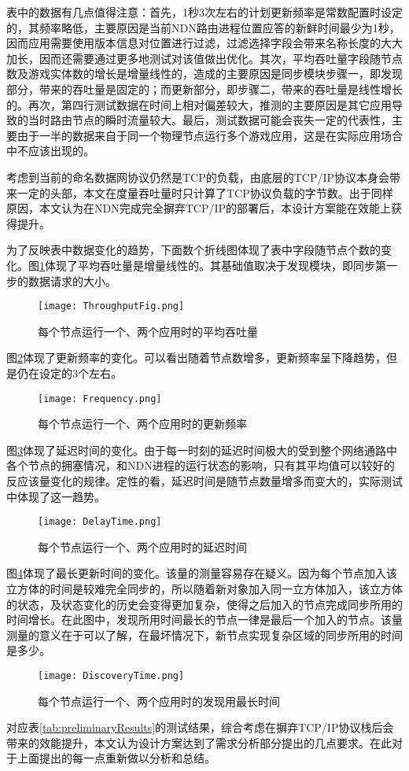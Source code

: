 \par
表中的数据有几点值得注意：首先，1秒3次左右的计划更新频率是常数配置时设定的，其频率略低，主要原因是当前NDN路由进程位置应答的新鲜时间最少为1秒，因而应用需要使用版本信息对位置进行过滤，过滤选择字段会带来名称长度的大大加长，因而还需要通过更多地测试对该值做出优化。其次，平均吞吐量字段随节点数及游戏实体数的增长是增量线性的，造成的主要原因是同步模块步骤一，即发现部分，带来的吞吐量是固定的；而更新部分，即步骤二，带来的吞吐量是线性增长的。再次，第四行测试数据在时间上相对偏差较大，推测的主要原因是其它应用导致的当时路由节点的瞬时流量较大。最后，测试数据可能会丧失一定的代表性，主要由于一半的数据来自于同一个物理节点运行多个游戏应用，这是在实际应用场合中不应该出现的。
\par
考虑到当前的命名数据网协议仍然是TCP的负载，由底层的TCP/IP协议本身会带来一定的头部，本文在度量吞吐量时只计算了TCP协议负载的字节数。出于同样原因，本文认为在NDN完成完全摒弃TCP/IP的部署后，本设计方案能在效能上获得提升。
\par
为了反映表中数据变化的趋势，下面数个折线图体现了表中字段随节点个数的变化。图\ref{fig:Throughput}体现了平均吞吐量是增量线性的。其基础值取决于发现模块，即同步第一步的数据请求的大小。
\begin{figure}[!h]
	\centering
	\texttt{[image: ThroughputFig.png]}
	\caption{每个节点运行一个、两个应用时的平均吞吐量}
	\label{fig:Throughput}
\end{figure}
\par
图\ref{fig:Frequency}体现了更新频率的变化。可以看出随着节点数增多，更新频率呈下降趋势，但是仍在设定的3个左右。
\begin{figure}[!h]
	\centering
	\texttt{[image: Frequency.png]}
	\caption{每个节点运行一个、两个应用时的更新频率}
	\label{fig:Frequency}
\end{figure}
\par
图\ref{fig:DelayTime}体现了延迟时间的变化。由于每一时刻的延迟时间极大的受到整个网络通路中各个节点的拥塞情况，和NDN进程的运行状态的影响，只有其平均值可以较好的反应该量变化的规律。定性的看，延迟时间是随节点数量增多而变大的，实际测试中体现了这一趋势。
\begin{figure}[!h]
	\centering
	\texttt{[image: DelayTime.png]}
	\caption{每个节点运行一个、两个应用时的延迟时间}
	\label{fig:DelayTime}
\end{figure}
\par
图\ref{fig:DiscoveryTime}体现了最长更新时间的变化。该量的测量容易存在疑义。因为每个节点加入该立方体的时间是较难完全同步的，所以随着新对象加入同一立方体加入，该立方体的状态，及状态变化的历史会变得更加复杂，使得之后加入的节点完成同步所用的时间增长。在此图中，发现所用时间最长的节点一律是最后一个加入的节点。该量测量的意义在于可以了解，在最坏情况下，新节点实现复杂区域的同步所用的时间是多少。
\begin{figure}[!h]
	\centering
	\texttt{[image: DiscoveryTime.png]}
	\caption{每个节点运行一个、两个应用时的发现用最长时间}
	\label{fig:DiscoveryTime}
\end{figure}
\par
对应表\ref{tab:preliminaryResults}的测试结果，综合考虑在摒弃TCP/IP协议栈后会带来的效能提升，本文认为设计方案达到了需求分析部分提出的几点要求。在此对于上面提出的每一点重新做以分析和总结。
